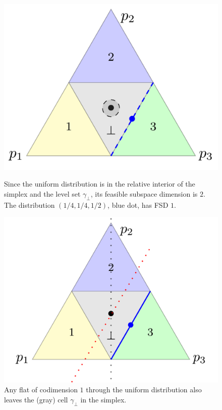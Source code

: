 \documentclass{article}
\begin{document}
\begin{figure}
\begin{minipage}{0.4\linewidth}
	\centering
	\includegraphics[width=\linewidth]{tikz/fsd-bound.pdf}
	\caption{Since the uniform distribution is in the relative interior of the simplex and the level set $\gamma_\bot$, its feasible subspace dimension is $2$. The distribution $(1/4, 1/4, 1/2)$, blue dot, has FSD $1$.}
	\label{fig:fsd-bound}
\end{minipage}
\hfill
\begin{minipage}{0.4\linewidth}
	\centering
	\includegraphics[width=\linewidth]{tikz/flats-bound.pdf}
	\caption{Any flat of codimension $1$ through the uniform distribution also leaves the (gray) cell $\gamma_\bot$ in the simplex. %
	}
	\label{fig:flats-bound}
\end{minipage}
\end{figure}
\end{document}
